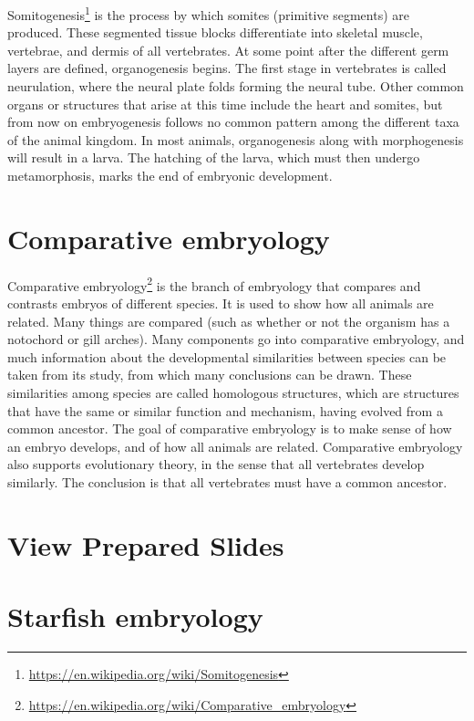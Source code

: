 \documentclass[]{book}
\let\rmarkdownfootnote\footnote%
\def\footnote{\protect\rmarkdownfootnote}
\renewcommand{\href}[2]{#2\footnote{\url{#1}}}
\begin{document}
\href{https://en.wikipedia.org/wiki/Somitogenesis}{Somitogenesis} is the process by which somites (primitive segments) are produced. These segmented tissue blocks differentiate into skeletal muscle, vertebrae, and dermis of all vertebrates. At some point after the different germ layers are defined, organogenesis begins. The first stage in vertebrates is called neurulation, where the neural plate folds forming the neural tube. Other common organs or structures that arise at this time include the heart and somites, but from now on embryogenesis follows no common pattern among the different taxa of the animal kingdom. In most animals, organogenesis along with morphogenesis will result in a larva. The hatching of the larva, which must then undergo metamorphosis, marks the end of embryonic development.

\hypertarget{comparative-embryology}{%
\section{Comparative embryology}\label{comparative-embryology}}

\href{https://en.wikipedia.org/wiki/Comparative_embryology}{Comparative embryology} is the branch of embryology that compares and contrasts embryos of different species. It is used to show how all animals are related. Many things are compared (such as whether or not the organism has a notochord or gill arches). Many components go into comparative embryology, and much information about the developmental similarities between species can be taken from its study, from which many conclusions can be drawn. These similarities among species are called homologous structures, which are structures that have the same or similar function and mechanism, having evolved from a common ancestor.
The goal of comparative embryology is to make sense of how an embryo develops, and of how all animals are related. Comparative embryology also supports evolutionary theory, in the sense that all vertebrates develop similarly. The conclusion is that all vertebrates must have a common ancestor.

\hypertarget{view-prepared-slides-1}{%
\section{View Prepared Slides}\label{view-prepared-slides-1}}

\hypertarget{starfish-embryology}{%
\section{Starfish embryology}\label{starfish-embryology}}
\end{document}
